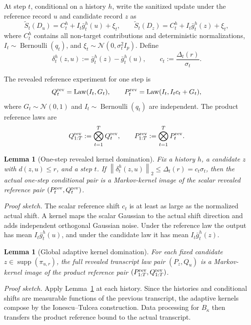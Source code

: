 \documentclass[11pt,a4paper]{report}
\theoremstyle{plain}
\newtheorem{lemma}[theorem]{Lemma}
\theoremstyle{definition}
\theoremstyle{remark}
\DeclareMathOperator{\Law}{Law}
\DeclareMathOperator{\supp}{supp}
\DeclareMathOperator{\Ber}{Bernoulli}
\newcommand{\N}{\mathcal{N}}
\newcommand{\norm}[1]{\left\lVert #1\right\rVert}
\begin{document}
At step $t$, conditional on a history $h$, write the sanitized update under the reference record $u$ and candidate record $z$ as
\[
\widetilde S_t(D_u)=C_t^h+I_t\bar g_t^h(u)+\xi_t,
\qquad
\widetilde S_t(D_z)=C_t^h+I_t\bar g_t^h(z)+\xi_t,
\]
where $C_t^h$ contains all non-target contributions and deterministic normalizations, $I_t\sim\Ber(q_t)$, and $\xi_t\sim\N(0,\sigma_t^2I_p)$.  Define
\[
\delta_t^h(z,u):=\bar g_t^h(z)-\bar g_t^h(u),
\qquad
c_t:=\frac{\Delta_t(r)}{\sigma_t}.
\]

The revealed reference experiment for one step is
\[
Q_t^{\rm rev}=\Law(I_t,G_t),
\qquad
P_t^{\rm rev}=\Law(I_t,I_tc_t+G_t),
\]
where $G_t\sim\N(0,1)$ and $I_t\sim\Ber(q_t)$ are independent.  The product reference laws are
\[
Q_{1:T}^{\rm rev}:=\bigotimes_{t=1}^TQ_t^{\rm rev},
\qquad
P_{1:T}^{\rm rev}:=\bigotimes_{t=1}^TP_t^{\rm rev}.
\]

\begin{lemma}[One-step revealed kernel domination]
\label{lem:one-step-kernel-domination}
Fix a history $h$, a candidate $z$ with $d(z,u)\le r$, and a step $t$.  If $\norm{\delta_t^h(z,u)}_2\le\Delta_t(r)=c_t\sigma_t$, then the actual one-step conditional pair is a Markov-kernel image of the scalar revealed reference pair $(P_t^{\rm rev},Q_t^{\rm rev})$.
\end{lemma}

\noindent\emph{Proof sketch.}
The scalar reference shift $c_t$ is at least as large as the normalized actual shift.  A kernel maps the scalar Gaussian to the actual shift direction and adds independent orthogonal Gaussian noise.  Under the reference law the output has mean $I_t\bar g_t^h(u)$, and under the candidate law it has mean $I_t\bar g_t^h(z)$.

\begin{lemma}[Global adaptive kernel domination]
\label{lem:global-kernel-domination}
For each fixed candidate $z\in\supp(\pi_{u,r})$, the full revealed transcript law pair $(P_z,Q_u)$ is a Markov-kernel image of the product reference pair $(P_{1:T}^{\rm rev},Q_{1:T}^{\rm rev})$.
\end{lemma}

\noindent\emph{Proof sketch.}
Apply Lemma~\ref{lem:one-step-kernel-domination} at each history.  Since the histories and conditional shifts are measurable functions of the previous transcript, the adaptive kernels compose by the Ionescu--Tulcea construction.  Data processing for $B_\kappa$ then transfers the product reference bound to the actual transcript.
\end{document}
